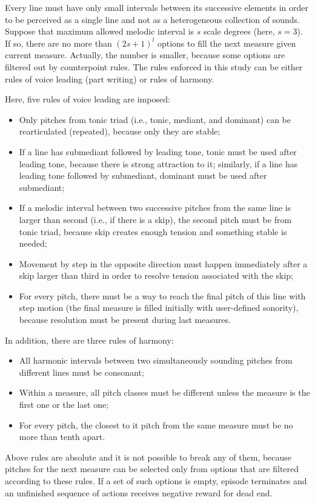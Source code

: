\documentclass{article}
\begin{document}
Every line must have only small intervals between its successive elements in order to be perceived as a single line and not as a heterogeneous collection of sounds. Suppose that maximum allowed melodic interval is $s$ scale degrees (here, $s = 3$). If so, there are no more than $(2s + 1)^l$ options to fill the next measure given current measure. Actually, the number is smaller, because some options are filtered out by counterpoint rules. The rules enforced in this study can be either rules of voice leading (part writing) or rules of harmony.

Here, five rules of voice leading are imposed:
\begin{itemize}
	\item Only pitches from tonic triad (i.e., tonic, mediant, and dominant) can be rearticulated (repeated), because only they are stable;
	\item If a line has submediant followed by leading tone, tonic must be used after leading tone, because there is strong attraction to it; similarly, if a line has leading tone followed by submediant, dominant must be used after submediant;
	\item If a melodic interval between two successive pitches from the same line is larger than second (i.e., if there is a skip), the second pitch must be from tonic triad, because skip creates enough tension and something stable is needed;
	\item Movement by step in the opposite direction must happen immediately after a skip larger than third in order to resolve tension associated with the skip;
	\item For every pitch, there must be a way to reach the final pitch of this line with step motion (the final measure is filled initially with user-defined sonority), because resolution must be present during last measures.
\end{itemize}
In addition, there are three rules of harmony:
\begin{itemize}
	\item All harmonic intervals between two simultaneously sounding pitches from different lines must be consonant;
	\item Within a measure, all pitch classes must be different unless the measure is the first one or the last one;
	\item For every pitch, the closest to it pitch from the same measure must be no more than tenth apart.
\end{itemize}

Above rules are absolute and it is not possible to break any of them, because pitches for the next measure can be selected only from options that are filtered according to these rules. If a set of such options is empty, episode terminates and an unfinished sequence of actions receives negative reward for dead end.
\end{document}
